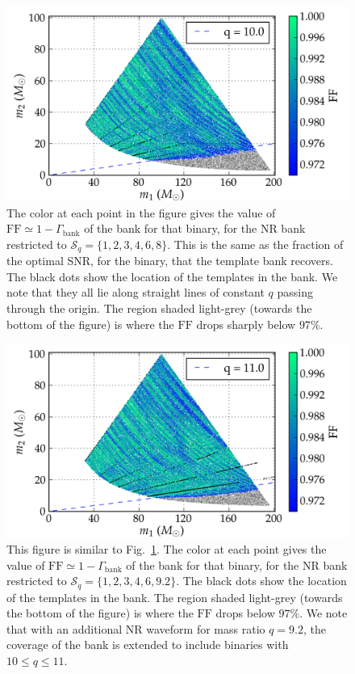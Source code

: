 \documentclass[aps,
prd,
twocolumn,
superscriptaddress,
lengthcheck,showpacs,letterpaper,nofootinbib,
floatfix]{revtex4-1}
\newcommand{\bnk}{\mathrm{bank}}
\newcommand{\FF}{\mathrm{FF}}
\begin{document}
\begin{figure}
\centering
\includegraphics[width=\columnwidth]{bank002_01_01_mtot200_match_cropped-tiny.png}
\caption{The color at each point in the figure gives the
value of $\FF\simeq 1-\Gamma_{\bnk}$ of the bank for that binary, for
the NR bank restricted to $\mathcal{S}_q=\{1,2,3,4,6,8\}$. This is the
same as the fraction of the optimal SNR, for the binary, that the
template bank recovers. The black dots show
the location of the templates in the bank. We note that they all lie
along straight lines of constant $q$ passing through the origin. The region 
shaded light-grey (towards the bottom of the figure) is where the $\FF$ 
drops sharply below $97\%$.}
\label{fig:bank001_01_match}
\end{figure}
\begin{figure}
\centering
\includegraphics[width=\columnwidth]{bank006_01_mtot200_match_cropped-tiny.png}
\caption{This figure is similar to Fig.~\ref{fig:bank001_01_match}.
The color at each point gives the value of 
$\FF\simeq 1-\Gamma_{\bnk}$ of the bank for that binary, for
the NR bank restricted to $\mathcal{S}_q=\{1,2,3,4,6,9.2\}$.
The black dots show the location of the templates in the bank. 
The region shaded light-grey (towards the bottom of the figure) is 
where the $\FF$ drops below $97\%$. We note that with an additional
NR waveform for mass ratio $q=9.2$, the coverage of the bank is 
extended to include binaries with $10\leq q\leq 11$.}
\label{fig:bank006_01_match}
\end{figure}
\end{document}
